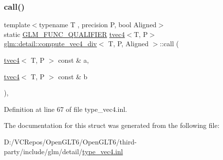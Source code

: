 \subsubsection{\texorpdfstring{call()}{call()}}
{\footnotesize\ttfamily template$<$typename T , precision P, bool Aligned$>$ \\
static \mbox{\hyperlink{setup_8hpp_a33fdea6f91c5f834105f7415e2a64407}{G\+L\+M\+\_\+\+F\+U\+N\+C\+\_\+\+Q\+U\+A\+L\+I\+F\+I\+ER}} \mbox{\hyperlink{structglm_1_1tvec4}{tvec4}}$<$T, P$>$ \mbox{\hyperlink{structglm_1_1detail_1_1compute__vec4__div}{glm\+::detail\+::compute\+\_\+vec4\+\_\+div}}$<$ T, P, Aligned $>$\+::call (\begin{DoxyParamCaption}\item[{\mbox{\hyperlink{structglm_1_1tvec4}{tvec4}}$<$ T, P $>$ const \&}]{a,  }\item[{\mbox{\hyperlink{structglm_1_1tvec4}{tvec4}}$<$ T, P $>$ const \&}]{b }\end{DoxyParamCaption})\hspace{0.3cm}{\ttfamily [inline]}, {\ttfamily [static]}}



Definition at line 67 of file type\+\_\+vec4.\+inl.



The documentation for this struct was generated from the following file\+:\begin{DoxyCompactItemize}
\item 
D\+:/\+V\+C\+Repos/\+Open\+G\+L\+T6/\+Open\+G\+L\+T6/third-\/party/include/glm/detail/\mbox{\hyperlink{type__vec4_8inl}{type\+\_\+vec4.\+inl}}\end{DoxyCompactItemize}

